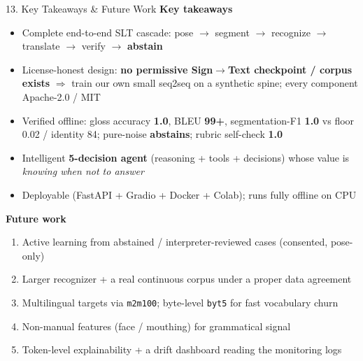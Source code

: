 \documentclass[10pt,aspectratio=169]{beamer}
\begin{document}
\begin{frame}{13. Key Takeaways \& Future Work}
\textbf{Key takeaways}
\begin{itemize}\small
  \item Complete end-to-end SLT cascade: pose $\rightarrow$ segment $\rightarrow$ recognize $\rightarrow$ translate $\rightarrow$ verify $\rightarrow$ \textbf{abstain}
  \item License-honest design: \textbf{no permissive Sign$\rightarrow$Text checkpoint / corpus exists} $\Rightarrow$ train our own small seq2seq on a synthetic spine; every component Apache-2.0 / MIT
  \item Verified offline: gloss accuracy \textbf{1.0}, BLEU \textbf{99+}, segmentation-F1 \textbf{1.0} vs floor 0.02 / identity 84; pure-noise \textbf{abstains}; rubric self-check \textbf{1.0}
  \item Intelligent \textbf{5-decision agent} (reasoning + tools + decisions) whose value is \emph{knowing when not to answer}
  \item Deployable (FastAPI + Gradio + Docker + Colab); runs fully offline on CPU
\end{itemize}

\textbf{Future work}
\begin{enumerate}\small
  \item Active learning from abstained / interpreter-reviewed cases (consented, pose-only)
  \item Larger recognizer + a real continuous corpus under a proper data agreement
  \item Multilingual targets via \texttt{m2m100}; byte-level \texttt{byt5} for fast vocabulary churn
  \item Non-manual features (face / mouthing) for grammatical signal
  \item Token-level explainability + a drift dashboard reading the monitoring logs
\end{enumerate}
\end{frame}
\end{document}

